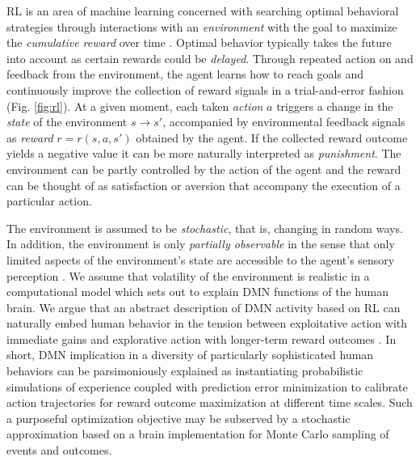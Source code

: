 \documentclass[10pt,letterpaper]{article}
\begin{document}
RL is an area of machine learning concerned with searching optimal behavioral strategies through interactions
with an \textit{environment} with the goal to maximize the \textit{cumulative reward} over time
\citep{sutton1998reinforcement}.
Optimal behavior typically
takes the future into account as certain rewards could be \textit{delayed}.
Through repeated action on and feedback from the environment,
the agent learns how to reach goals and continuously improve the collection of reward signals
in a trial-and-error fashion (Fig. \ref{fig:rl}).
At a given moment, each taken \textit{action} $a$ triggers a change
in the \textit{state} of the environment
$s \rightarrow s'$, accompanied by environmental feedback signals as \textit{reward}
$r = r(s, a,s')$ obtained by the agent.
If the collected reward outcome yields a negative value it can be
more naturally interpreted as \textit{punishment}.
The environment can be partly controlled by
the action of the agent and the reward can be thought
of as satisfaction \textemdash or aversion \textemdash that accompany the execution of
a particular action.



The environment is assumed to be \textit{stochastic},
that is, changing in random ways. In addition, the environment is only
\textit{partially observable} in the sense that only limited aspects of the environment's
state are accessible to the agent's sensory perception
\citep{starkweather2017dopamine}.
We assume that volatility of the environment
is realistic in a computational model which sets out
to explain DMN functions of the human brain.
We argue that an abstract description of DMN activity based on RL
can naturally embed human behavior
in the tension between exploitative action with immediate gains and
explorative action with longer-term reward outcomes
\citep{dayan2008decision}.
In short, DMN implication in a diversity of
particularly sophisticated human behaviors
can be parsimoniously explained as instantiating probabilistic
simulations of experience coupled with prediction error minimization
to calibrate action trajectories for
reward outcome maximization at different time scales.
Such a purposeful optimization objective
may be subserved by a stochastic approximation
based on a brain implementation for Monte Carlo sampling of events and outcomes.
\end{document}
